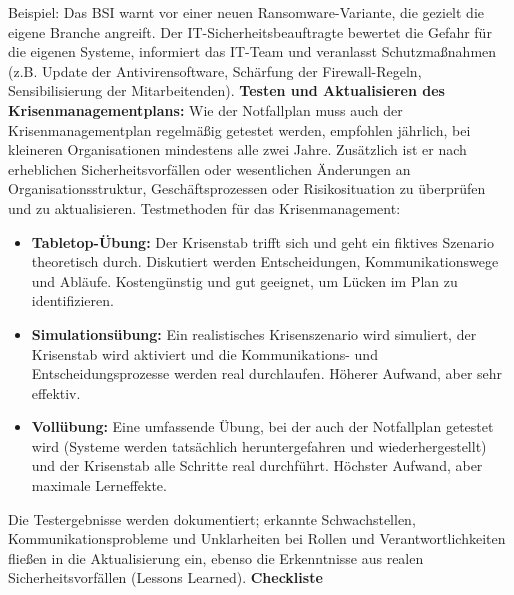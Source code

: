 Beispiel: Das BSI warnt vor einer neuen Ransomware-Variante, die gezielt die eigene Branche angreift. Der IT-Sicherheitsbeauftragte bewertet die Gefahr für die eigenen Systeme, informiert das IT-Team und veranlasst Schutzmaßnahmen (z.B. Update der Antivirensoftware, Schärfung der Firewall-Regeln, Sensibilisierung der Mitarbeitenden).
\newpage
\textbf{Testen und Aktualisieren des Krisenmanagementplans:}
Wie der Notfallplan muss auch der Krisenmanagementplan regelmäßig getestet werden, empfohlen jährlich, bei kleineren Organisationen mindestens alle zwei Jahre. Zusätzlich ist er nach erheblichen Sicherheitsvorfällen oder wesentlichen Änderungen an Organisationsstruktur, Geschäftsprozessen oder Risikosituation zu überprüfen und zu aktualisieren.
Testmethoden für das Krisenmanagement:
\begin{itemize}
    \item \textbf{Tabletop-Übung:} Der Krisenstab trifft sich und geht ein fiktives Szenario theoretisch durch. Diskutiert werden Entscheidungen, Kommunikationswege und Abläufe. Kostengünstig und gut geeignet, um Lücken im Plan zu identifizieren.
    \item \textbf{Simulationsübung:} Ein realistisches Krisenszenario wird simuliert, der Krisenstab wird aktiviert und die Kommunikations- und Entscheidungsprozesse werden real durchlaufen. Höherer Aufwand, aber sehr effektiv.
    \item \textbf{Vollübung:} Eine umfassende Übung, bei der auch der Notfallplan getestet wird (Systeme werden tatsächlich heruntergefahren und wiederhergestellt) und der Krisenstab alle Schritte real durchführt. Höchster Aufwand, aber maximale Lerneffekte.
\end{itemize}
Die Testergebnisse werden dokumentiert; erkannte Schwachstellen, Kommunikationsprobleme und Unklarheiten bei Rollen und Verantwortlichkeiten fließen in die Aktualisierung ein, ebenso die Erkenntnisse aus realen Sicherheitsvorfällen (Lessons Learned).
\newpage
\textbf{Checkliste}
